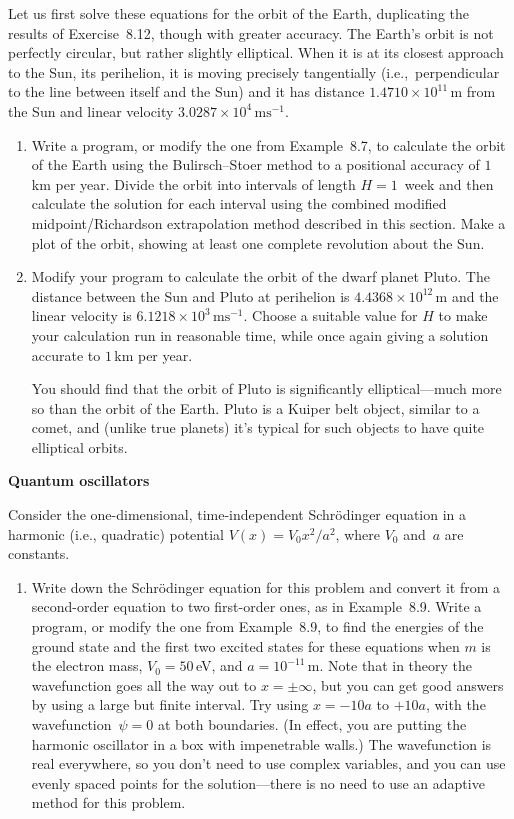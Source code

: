 \documentclass[12pt]{article}
\begin{document}
\begin{exercises}
Let us first solve these equations for the orbit of the Earth, duplicating
the results of Exercise~8.12, though with greater accuracy.  The Earth's
orbit is not perfectly circular, but rather slightly elliptical.  When it
is at its closest approach to the Sun, its perihelion, it is moving
precisely tangentially (i.e.,~perpendicular to the line between itself and
the Sun) and it has distance $1.4710\times10^{11}\,$m from the Sun and
linear velocity $3.0287\times10^4\,\mathrm{ms^{-1}}$.
\begin{enumerate}\setlength{\itemsep}{0pt}
\item Write a program, or modify the one from Example~8.7, to calculate the
  orbit of the Earth using the Bulirsch--Stoer method to a positional
  accuracy of $1\,$km per year.  Divide the orbit into intervals of length
  $H = 1$~week and then calculate the solution for each interval using the
  combined modified midpoint/Richardson extrapolation method described in
  this section.  Make a plot of the orbit, showing at least one complete
  revolution about the Sun.
\item Modify your program to calculate the orbit of the dwarf planet Pluto.
  The distance between the Sun and Pluto at perihelion is
  $4.4368\times10^{12}\,$m and the linear velocity is
  $6.1218\times10^3\,\mathrm{ms^{-1}}$.  Choose a suitable value for $H$ to
  make your calculation run in reasonable time, while once again giving a
  solution accurate to $1\,$km per year.

  You should find that the orbit of Pluto is significantly
  elliptical---much more so than the orbit of the Earth.  Pluto is a Kuiper
  belt object, similar to a comet, and (unlike true planets) it's typical
  for such objects to have quite elliptical orbits.
\end{enumerate}



\exercise \textbf{Quantum oscillators}

\exskip Consider the one-dimensional,
time-independent Schr\"odinger equation in a harmonic (i.e., quadratic)
potential $V(x)=V_0 x^2/a^2$, where $V_0$ and~$a$ are constants.
\begin{enumerate}\setlength{\itemsep}{0pt}
\item Write down the Schr\"odinger equation for this problem and convert it
  from a second-order equation to two first-order ones, as in Example~8.9.
  Write a program, or modify the one from Example~8.9, to find the energies
  of the ground state and the first two excited states for these equations
  when $m$ is the electron mass, $V_0=50\,$eV, and $a=10^{-11}\,$m.  Note
  that in theory the wavefunction goes all the way out to $x=\pm\infty$,
  but you can get good answers by using a large but finite interval.  Try
  using $x=-10a$ to $+10a$, with the wavefunction~$\psi=0$ at both
  boundaries.  (In effect, you are putting the harmonic oscillator in a box
  with impenetrable walls.)  The wavefunction is real everywhere, so you
  don't need to use complex variables, and you can use evenly spaced points
  for the solution---there is no need to use an adaptive method for this
  problem.


\end{enumerate}
\end{exercises}
\end{document}

